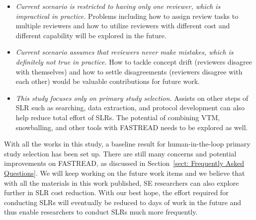\documentclass{svjour3}
\theoremstyle{break}
\begin{document}
\begin{itemize}
\item
{\em Current scenario is restricted to having only one reviewer, which is impractical in practice.} Problems including how to assign review tasks to multiple reviewers and how to utilize reviewers with different cost and different capability will be explored in the future.

\item
{\em Current scenario assumes that reviewers never make mistakes, which is definitely not true in practice.} How to tackle concept drift (reviewers disagree with themselves) and how to settle disagreements (reviewers disagree with each other) would be valuable contributions for future work.

\item
{\em This study focuses only on primary study selection.} Assists on other steps of SLR such as searching, data extraction, and protocol development can also help reduce total effort of SLRs. The potential of combining VTM, snowballing, and other tools with FASTREAD needs to be explored as well.


\end{itemize}

With all the works in this study, a baseline result for human-in-the-loop primary study selection has been set up. There are still many concerns and potential improvements on FASTREAD, as discussed in Section~\ref{sect: Frequently Asked Questions}. We will keep working on the future work items and we believe that with all the materials in this work published, SE researchers can also explore further in SLR cost reduction. With our best hope, the effort required for conducting SLRs will eventually be reduced to days of work in the future and thus enable researchers to conduct SLRs much more frequently.

 
% 

 
\end{document}
